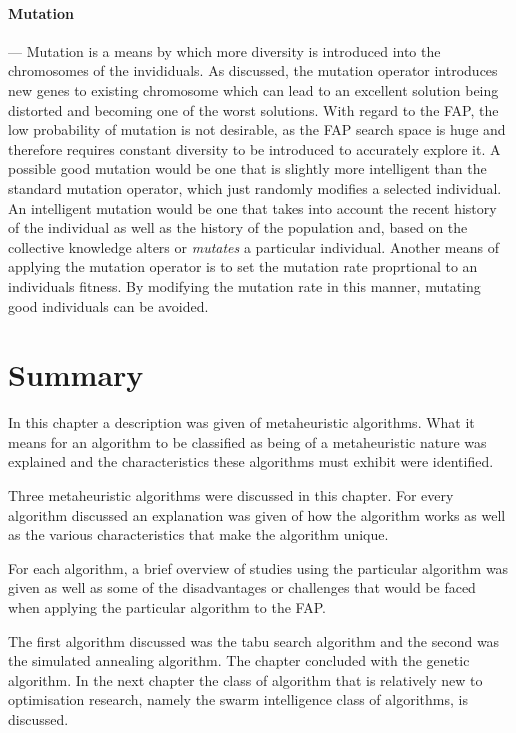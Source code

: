 \paragraph{Mutation}
--- Mutation is a means by which more diversity is introduced into the chromosomes of the invididuals.  As discussed, the mutation operator introduces new genes to existing chromosome which can lead to an excellent solution being distorted and becoming one of the worst solutions. With regard to the FAP, the low probability of mutation is not desirable, as the FAP search space is huge and therefore requires constant diversity to be introduced to accurately explore it. A possible good mutation would be one that is slightly more intelligent than the standard mutation operator, which just randomly modifies a selected individual. An intelligent mutation would be one that takes into account the recent history of the individual as well as the history of the population and, based on the collective knowledge alters or \emph{mutates} a particular individual. Another means of applying the mutation operator is to set the mutation rate proprtional to an individuals fitness. By modifying the mutation rate in this manner, mutating good individuals can be avoided.
\section {Summary}
In this chapter a description was given of metaheuristic algorithms. What it means for an algorithm to be classified as being of a metaheuristic nature was explained and the characteristics these algorithms must exhibit were identified.

Three metaheuristic algorithms were discussed in this chapter. For every algorithm discussed an explanation was given of how the algorithm works as well as the various characteristics that make the algorithm unique.

For each algorithm, a brief overview of studies using the particular algorithm was given as well as some of the disadvantages or challenges that would be faced when applying the particular algorithm to the FAP.

The first algorithm discussed was the tabu search algorithm and the second was the simulated annealing algorithm. The chapter concluded with the genetic algorithm. In the next chapter the class of algorithm that is relatively new to optimisation research, namely the swarm intelligence class of algorithms, is discussed.

